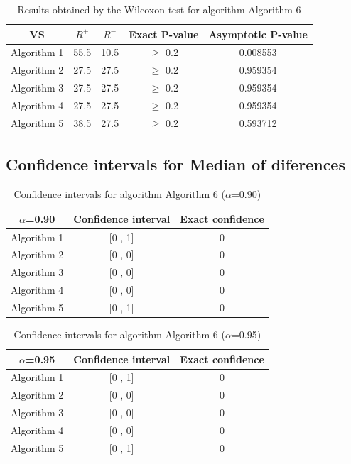 \documentclass[a4paper,10pt]{article}
\begin{document}
\begin{table}[!htp]
\centering\small
\begin{tabular}{
|c|c|c|c|c|}
\hline
 VS & $R^{+}$ & $R^{-}$ & Exact P-value & Asymptotic P-value \\ \hline 
Algorithm 1 & 55.5 & 10.5 & $\geq$ 0.2 & 0.008553\\ \hline 
Algorithm 2 & 27.5 & 27.5 & $\geq$ 0.2 & 0.959354\\ \hline 
Algorithm 3 & 27.5 & 27.5 & $\geq$ 0.2 & 0.959354\\ \hline 
Algorithm 4 & 27.5 & 27.5 & $\geq$ 0.2 & 0.959354\\ \hline 
Algorithm 5 & 38.5 & 27.5 & $\geq$ 0.2 & 0.593712\\ \hline 

\end{tabular}
\caption{Results obtained by the Wilcoxon test for algorithm Algorithm 6}
\end{table}

\subsection{Confidence intervals for Median of diferences}

\begin{table}[!htp]
\centering\small
\begin{tabular}{
|c|c|c|}
\hline
 $\alpha$=0.90 & Confidence interval & Exact confidence \\ \hline 
Algorithm 1 & [0 , 1] & 0\\ \hline 
Algorithm 2 & [0 , 0] & 0\\ \hline 
Algorithm 3 & [0 , 0] & 0\\ \hline 
Algorithm 4 & [0 , 0] & 0\\ \hline 
Algorithm 5 & [0 , 1] & 0\\ \hline 

\end{tabular}
\caption{Confidence intervals for algorithm Algorithm 6 ($\alpha$=0.90)}
\end{table}
\begin{table}[!htp]
\centering\small
\begin{tabular}{
|c|c|c|}
\hline
 $\alpha$=0.95 & Confidence interval & Exact confidence \\ \hline 
Algorithm 1 & [0 , 1] & 0\\ \hline 
Algorithm 2 & [0 , 0] & 0\\ \hline 
Algorithm 3 & [0 , 0] & 0\\ \hline 
Algorithm 4 & [0 , 0] & 0\\ \hline 
Algorithm 5 & [0 , 1] & 0\\ \hline 

\end{tabular}
\caption{Confidence intervals for algorithm Algorithm 6 ($\alpha$=0.95)}
\end{table}

 \clearpage 
\end{document}
